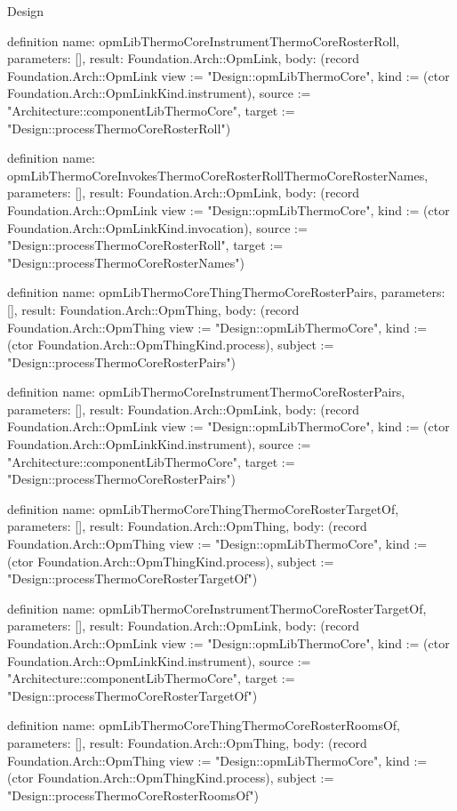 \begin{lexlean}{Design}
\begin{semanticmodule}
definition{
  name: opmLibThermoCoreInstrumentThermoCoreRosterRoll,
  parameters: [],
  result: Foundation.Arch::OpmLink,
  body: (record Foundation.Arch::OpmLink {view := "Design::opmLibThermoCore", kind := (ctor Foundation.Arch::OpmLinkKind.instrument), source := "Architecture::componentLibThermoCore", target := "Design::processThermoCoreRosterRoll"})
}

definition{
  name: opmLibThermoCoreInvokesThermoCoreRosterRollThermoCoreRosterNames,
  parameters: [],
  result: Foundation.Arch::OpmLink,
  body: (record Foundation.Arch::OpmLink {view := "Design::opmLibThermoCore", kind := (ctor Foundation.Arch::OpmLinkKind.invocation), source := "Design::processThermoCoreRosterRoll", target := "Design::processThermoCoreRosterNames"})
}

definition{
  name: opmLibThermoCoreThingThermoCoreRosterPairs,
  parameters: [],
  result: Foundation.Arch::OpmThing,
  body: (record Foundation.Arch::OpmThing {view := "Design::opmLibThermoCore", kind := (ctor Foundation.Arch::OpmThingKind.process), subject := "Design::processThermoCoreRosterPairs"})
}

definition{
  name: opmLibThermoCoreInstrumentThermoCoreRosterPairs,
  parameters: [],
  result: Foundation.Arch::OpmLink,
  body: (record Foundation.Arch::OpmLink {view := "Design::opmLibThermoCore", kind := (ctor Foundation.Arch::OpmLinkKind.instrument), source := "Architecture::componentLibThermoCore", target := "Design::processThermoCoreRosterPairs"})
}

definition{
  name: opmLibThermoCoreThingThermoCoreRosterTargetOf,
  parameters: [],
  result: Foundation.Arch::OpmThing,
  body: (record Foundation.Arch::OpmThing {view := "Design::opmLibThermoCore", kind := (ctor Foundation.Arch::OpmThingKind.process), subject := "Design::processThermoCoreRosterTargetOf"})
}

definition{
  name: opmLibThermoCoreInstrumentThermoCoreRosterTargetOf,
  parameters: [],
  result: Foundation.Arch::OpmLink,
  body: (record Foundation.Arch::OpmLink {view := "Design::opmLibThermoCore", kind := (ctor Foundation.Arch::OpmLinkKind.instrument), source := "Architecture::componentLibThermoCore", target := "Design::processThermoCoreRosterTargetOf"})
}

definition{
  name: opmLibThermoCoreThingThermoCoreRosterRoomsOf,
  parameters: [],
  result: Foundation.Arch::OpmThing,
  body: (record Foundation.Arch::OpmThing {view := "Design::opmLibThermoCore", kind := (ctor Foundation.Arch::OpmThingKind.process), subject := "Design::processThermoCoreRosterRoomsOf"})
}


\end{semanticmodule}
\end{lexlean}
